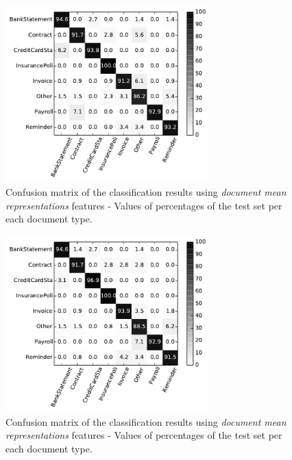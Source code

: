 

\begin{figure}[h]
    \centering
    \includegraphics[width=0.7\textwidth]{images/002-xvalidaton-dmr.pdf}
    \caption{Confusion matrix of the classification results  using \textit{document mean
      representations} features - Values of percentages of the test set per
    each document type.}
    \label{fig:confusion-matrix-dmr}
\end{figure}


\begin{figure}[h]
    \centering
    \includegraphics[width=0.7\textwidth]{images/003-xvalidaton-bow.pdf}
    \caption{Confusion matrix of the classification results  using \textit{document mean
      representations} features - Values of percentages of the test set per
    each document type.}
    \label{fig:confusion-matrix-bow}
\end{figure}




